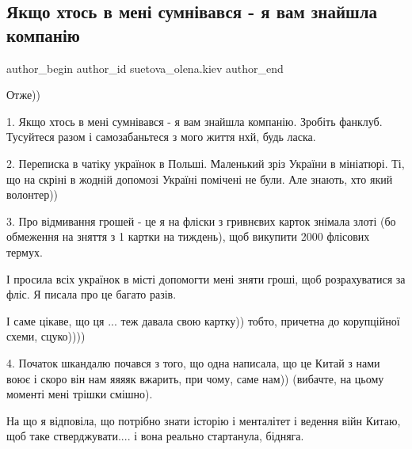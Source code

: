  
 
 
 
 
 
\subsection{Якщо хтось в мені сумнівався - я вам знайшла компанію}
\label{sec:16_11_2022.fb.suetova_olena.kiev.1.kompania}
 
\ifcmt
 author_begin
   author_id suetova_olena.kiev
 author_end
\fi

Отже))

1. Якщо хтось в мені сумнівався - я вам знайшла компанію. Зробіть фанклуб.
Тусуйтеся разом і самозабаньтеся з мого життя нхй, будь ласка.

2. Переписка в чатіку українок в Польші.  Маленький зріз України в мініатюрі.
Ті, що на скріні в жодній допомозі Україні помічені не були. Але знають, хто
який волонтер))


3. Про відмивання грошей - це я на фліски з гривнєвих карток знімала злоті (бо
обмеження на зняття з 1 картки на тиждень), щоб викупити 2000 флісових термух. 

І просила всіх українок в місті допомогти мені зняти гроші, щоб розрахуватися
за фліс. Я писала про це багато разів.

І саме цікаве, що ця ... теж давала свою картку)) тобто, причетна до
корупційної схеми, сцуко))))

4. Початок шкандалю почався з того, що одна написала, що це Китай з нами воює і
скоро він нам яяяяк вжарить, при чому, саме нам)) (вибачте, на цьому моменті
мені трішки смішно).

На що я відповіла, що потрібно знати історію і менталітет і ведення війн Китаю,
щоб таке стверджувати.... і вона реально стартанула, бідняга.

